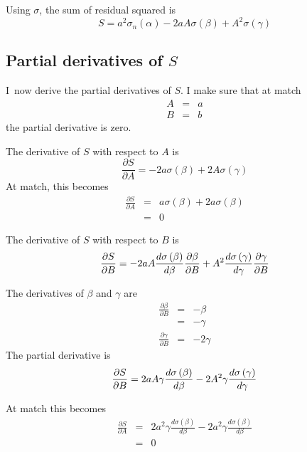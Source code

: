 \documentclass{article}
\begin{document}
Using $\sigma $, the sum of residual squared is%
\begin{equation}
S=a^{2}\sigma _{n}\left( \alpha \right) -2aA\sigma \left( \beta \right)
+A^{2}\sigma \left( \gamma \right)   \label{eq:S(sigma,alpha,beta,gamma)}
\end{equation}

\subsection{Partial derivatives of $S$}

I\ now derive the partial derivatives of $S$. I make sure that at match%
\begin{eqnarray}
A &=&a  \label{def:match} \\
B &=&b
\end{eqnarray}%
the partial derivative is zero.

The derivative of $S$ with respect to $A$ is%
\begin{equation}
\frac{\partial S}{\partial A}=-2a\sigma \left( \beta \right) +2A\sigma
\left( \gamma \right) 
\end{equation}%
At match, this becomes%
\begin{eqnarray}
\frac{\partial S}{\partial A} &=&a\sigma \left( \beta \right) +2a\sigma
\left( \beta \right)  \\
&=&0
\end{eqnarray}

The derivative of $S$ with respect to $B$ is%
\begin{equation}
\frac{\partial S}{\partial B}=-2aA\frac{d\sigma \left( \beta \right) }{%
d\beta }\frac{\partial \beta }{\partial B}+A^{2}\frac{d\sigma \left( \gamma
\right) }{d\gamma }\frac{\partial \gamma }{\partial B}
\end{equation}

The derivatives of $\beta $ and $\gamma $ are%
\begin{eqnarray}
\frac{\partial \beta }{\partial B} &=&-\beta  \\
&=&-\gamma  \\
\frac{\partial \gamma }{\partial B} &=&-2\gamma 
\end{eqnarray}%
The partial derivative is%
\begin{equation}
\frac{\partial S}{\partial B}=2aA\gamma \frac{d\sigma \left( \beta \right) }{%
d\beta }-2A^{2}\gamma \frac{d\sigma \left( \gamma \right) }{d\gamma }
\end{equation}

At match this becomes%
\begin{eqnarray}
\frac{\partial S}{\partial A} &=&2a^{2}\gamma \frac{d\sigma \left( \beta
\right) }{d\beta }-2a^{2}\gamma \frac{d\sigma \left( \beta \right) }{d\beta }
\\
&=&0
\end{eqnarray}
\end{document}
